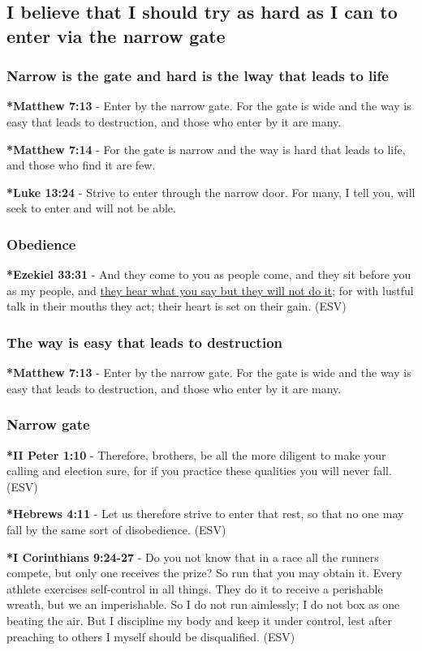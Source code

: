 \documentclass[11pt]{article}
\begin{document}
\subsection{I believe that I should try as hard as I can to enter via the narrow gate}
\label{sec:org1534669}
\subsubsection{Narrow is the gate and hard is the lway that leads to life}
\label{sec:orgb09d0e1}
\textbf{*Matthew 7:13} - Enter by the narrow gate. For the gate is wide and the way is easy that leads to destruction, and those who enter by it are many.

\textbf{*Matthew 7:14} - For the gate is narrow and the way is hard that leads to life, and those who find it are few.

\textbf{*Luke 13:24} - Strive to enter through the narrow door. For many, I tell you, will seek to enter and will not be able.

\subsubsection{Obedience}
\label{sec:org15b0e73}
\textbf{*Ezekiel 33:31} - And they come to you as people come, and they sit before you as my people, and \uline{they hear what you say but they will not do it}; for with lustful talk in their mouths they act; their heart is set on their gain. (ESV)

\subsubsection{The way is easy that leads to destruction}
\label{sec:orgd0bc1c7}
\textbf{*Matthew 7:13} - Enter by the narrow gate. For the gate is wide and the way is easy that leads to destruction, and those who enter by it are many.

\subsubsection{Narrow gate}
\label{sec:org7fa5fa1}
\textbf{*II Peter 1:10} - Therefore, brothers, be all the more diligent to make your calling and election sure, for if you practice these qualities you will never fall. (ESV)

\textbf{*Hebrews 4:11} - Let us therefore strive to enter that rest, so that no one may fall by the same sort of disobedience. (ESV)

\textbf{*I Corinthians 9:24-27} - Do you not know that in a race all the runners compete, but only one receives the prize? So run that you may obtain it. Every athlete exercises self-control in all things. They do it to receive a perishable wreath, but we an imperishable. So I do not run aimlessly; I do not box as one beating the air. But I discipline my body and keep it under control, lest after preaching to others I myself should be disqualified. (ESV)
\end{document}
